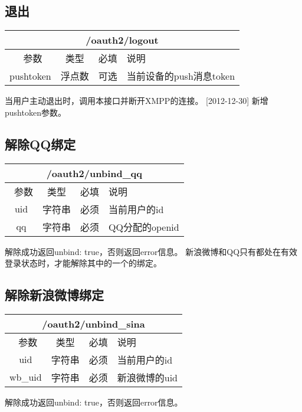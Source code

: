 \documentclass[cs4size]{ctexartutf8}
\begin{document}
\subsection{退出}

\begin{table}[H]
   \begin{center}
\begin{tabular}{|c|c|c|p{12cm}|}
\hline
\multicolumn{4}{|c|}{/oauth2/logout} \\
\hline\hline
 \  参数  & 类型 & 必填 &  说明  \\
\hline
    pushtoken  & 浮点数 & 可选 &  当前设备的push消息token\\
\hline
\end{tabular}
   \end{center}
\end{table}

当用户主动退出时，调用本接口并断开XMPP的连接。
[2012-12-30] 新增pushtoken参数。


\subsection{解除QQ绑定}

\begin{table}[H]
   \begin{center}
\begin{tabular}{|c|c|c|p{12cm}|}
\hline
\multicolumn{4}{|c|}{/oauth2/unbind\_qq} \\
\hline\hline
 \  参数  & 类型 & 必填 &  说明  \\
\hline
    uid  & 字符串 & 必须 &  当前用户的id\\
\hline
    qq  & 字符串 & 必须 &  QQ分配的openid\\    
\hline
\end{tabular}
   \end{center}
\end{table}
解除成功返回{unbind: true}，否则返回error信息。
新浪微博和QQ只有都处在有效登录状态时，才能解除其中的一个的绑定。


\subsection{解除新浪微博绑定}

\begin{table}[H]
   \begin{center}
\begin{tabular}{|c|c|c|p{12cm}|}
\hline
\multicolumn{4}{|c|}{/oauth2/unbind\_sina} \\
\hline\hline
 \  参数  & 类型 & 必填 &  说明  \\
\hline
    uid  & 字符串 & 必须 &  当前用户的id\\
\hline
    wb\_uid  & 字符串 & 必须 &  新浪微博的uid\\    
\hline
\end{tabular}
   \end{center}
\end{table}
解除成功返回{unbind: true}，否则返回error信息。
\end{document}
